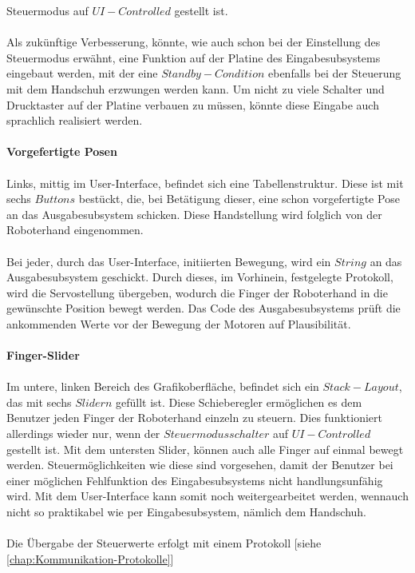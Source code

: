 \documentclass[titlepage,12pt,twoside]{article}
\begin{document}
Steuermodus auf $UI-Controlled$ gestellt ist. \\
\\
Als zukünftige Verbesserung, könnte, wie auch schon bei der Einstellung des Steuermodus erwähnt, eine Funktion auf der Platine des Eingabesubsystems eingebaut werden, mit der eine $Standby-Condition$
ebenfalls bei der Steuerung mit dem Handschuh erzwungen werden kann. Um nicht zu viele Schalter und Drucktaster auf der Platine verbauen zu müssen, könnte diese Eingabe auch sprachlich realisiert werden. \\
\\
\textbf{Vorgefertigte Posen} \\
\\
Links, mittig im User-Interface, befindet sich eine Tabellenstruktur. Diese ist mit sechs $Buttons$ bestückt, die, bei Betätigung dieser, eine schon vorgefertigte Pose an das Ausgabesubsystem schicken. Diese Handstellung
wird folglich von der Roboterhand eingenommen. \\
\\
Bei jeder, durch das User-Interface, initiierten Bewegung, wird ein $String$ an das Ausgabesubsystem geschickt. Durch dieses, im Vorhinein, festgelegte Protokoll, wird die Servostellung übergeben, wodurch die Finger der
Roboterhand in die gewünschte Position bewegt werden. Das Code des Ausgabesubsystems prüft die ankommenden Werte vor der Bewegung der Motoren auf Plausibilität. \\
\\
\textbf{Finger-Slider} \\
\\
Im untere, linken Bereich des Grafikoberfläche, befindet sich ein $Stack-Layout$, das mit sechs $Slidern$ gefüllt ist. Diese Schieberegler ermöglichen es dem Benutzer jeden Finger der Roboterhand einzeln zu steuern. Dies
funktioniert allerdings wieder nur, wenn der $Steuermodusschalter$ auf $UI-Controlled$ gestellt ist. Mit dem untersten Slider, können auch alle Finger auf einmal bewegt werden. Steuermöglichkeiten wie diese sind vorgesehen, 
damit der Benutzer bei einer möglichen Fehlfunktion des Eingabesubsystems nicht handlungsunfähig wird. Mit dem User-Interface kann somit noch weitergearbeitet werden, wennauch nicht so praktikabel wie per Eingabesubsystem, nämlich dem Handschuh. \\
\\
Die Übergabe der Steuerwerte erfolgt mit einem Protokoll [siehe \textcolor{blue}{\autoref{chap:Kommunikation-Protokolle}}] \\
\end{document}
